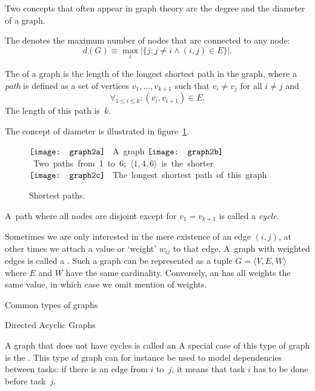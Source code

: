 Two concepts that often appear in graph theory are the
degree and the diameter of a graph. 

\begin{definition}
The
 denotes the maximum number of nodes that are
connected to any node:
\[ 
  d(G)\equiv \max_i 
  \left|\{j\colon j\not=i\wedge (i,j)\in E\}\right|.
\]
\end{definition}

\begin{definition}
The  of a graph is the length of the longest
shortest path
in the graph, where a \emph{path}
is defined as a set of vertices
$v_1,\ldots, v_{k+1}$ such that $v_i\not=v_j$ for all $i\not=j$ and
\[ \forall_{1\leq i\leq k}\colon (v_i,v_{i+1})\in E. \]
The length of this path is~$k$.
\end{definition}
The concept of diameter is illustrated
in figure~\ref{fig:graph2}.

\begin{figure}[ht]
  \hbox{$\vcenter{\hbox{%
        \texttt{[image: graph2a]}
    }}$%
    A graph}
  \hbox{$\vcenter{\hbox{%
        \texttt{[image: graph2b]}
    }}$%
    Two paths from 1 to 6; $\langle 1,4,6\rangle$ is the shorter}
  \hbox{$\vcenter{\hbox{%
        \texttt{[image: graph2c]}
    }}$%
    The longest shortest path of this graph}
  \caption{Shortest paths.}
  \label{fig:graph2}
\end{figure}

A~path where all nodes are disjoint
except for $v_1=v_{k+1}$ is called a \emph{cycle}.

Sometimes we are only interested in the mere existence of an edge
$(i,j)$, at other times we attach a value or `weight' $w_{ij}$ to that
edge.
A~graph with weighted edges is called a %
.
Such a graph can be represented as a tuple
$G=\langle V,E,W\rangle$ where $E$ and $W$ have the same cardinality.
Conversely, an %
has all weights the same value, in which case we omit mention of weights.

 {Common types of graphs}

 {Directed Acyclic Graphs}

A graph that does not have cycles is called an
A special case of this type of graph is the .
This type of graph can for instance be
used to model dependencies between tasks:
if there is an edge from $i$ to~$j$,
it means that task $i$ has to be done before task~$j$.

